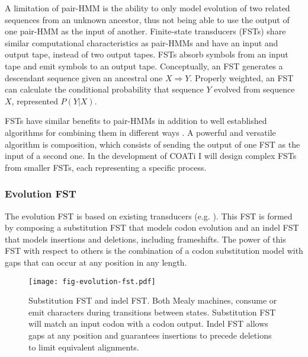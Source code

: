 A limitation of pair-HMM is the ability to only model evolution of two related
sequences from an unknown ancestor, thus not being able to use the output of one
pair-HMM as the input of another.
Finite-state transducers (FSTs) share similar computational characteristics as
pair-HMMs and have an input and output tape, instead of two output tapes.
FSTs absorb symbols from an input tape and emit symbols to an output tape.
Conceptually, an FST generates a descendant sequence given an ancestral one
$X \Rightarrow Y$.
Properly weighted, an FST can calculate the conditional probability that
sequence $Y$ evolved from sequence $X$, represented $P(Y|X)$.

FSTs have similar benefits to pair-HMMs in addition to well established
algorithms for combining them in different ways
\parencite{bradley2007transducers}.
A powerful and versatile algorithm is composition, which consists of sending the
output of one FST as the input of a second one.
In the development of COATi I will design complex FSTs from smaller FSTs, each
representing a specific process.

\subsubsection{Evolution FST}

The evolution FST is based on existing transducers
(e.g. \cite{holmes2001evolutionary}).
This FST is formed by composing a substitution FST that models codon
evolution and an indel FST that models insertions and deletions, including
frameshifts.
The power of this FST with respect to others is the combination of a codon
substitution model with gaps that can occur at any position in any length.

\begin{figure}[h]
\centering
    \texttt{[image: fig-evolution-fst.pdf]}
    \caption{Substitution FST and indel FST. Both Mealy machines, consume or
    emit characters during transitions between states. Substitution FST will
    match an input codon with a codon output.
    Indel FST allows gaps at any position and guarantees insertions to precede
    deletions to limit equivalent alignments.}
    \label{fig:evolution-fst}
\end{figure}

\vspace{2em}

